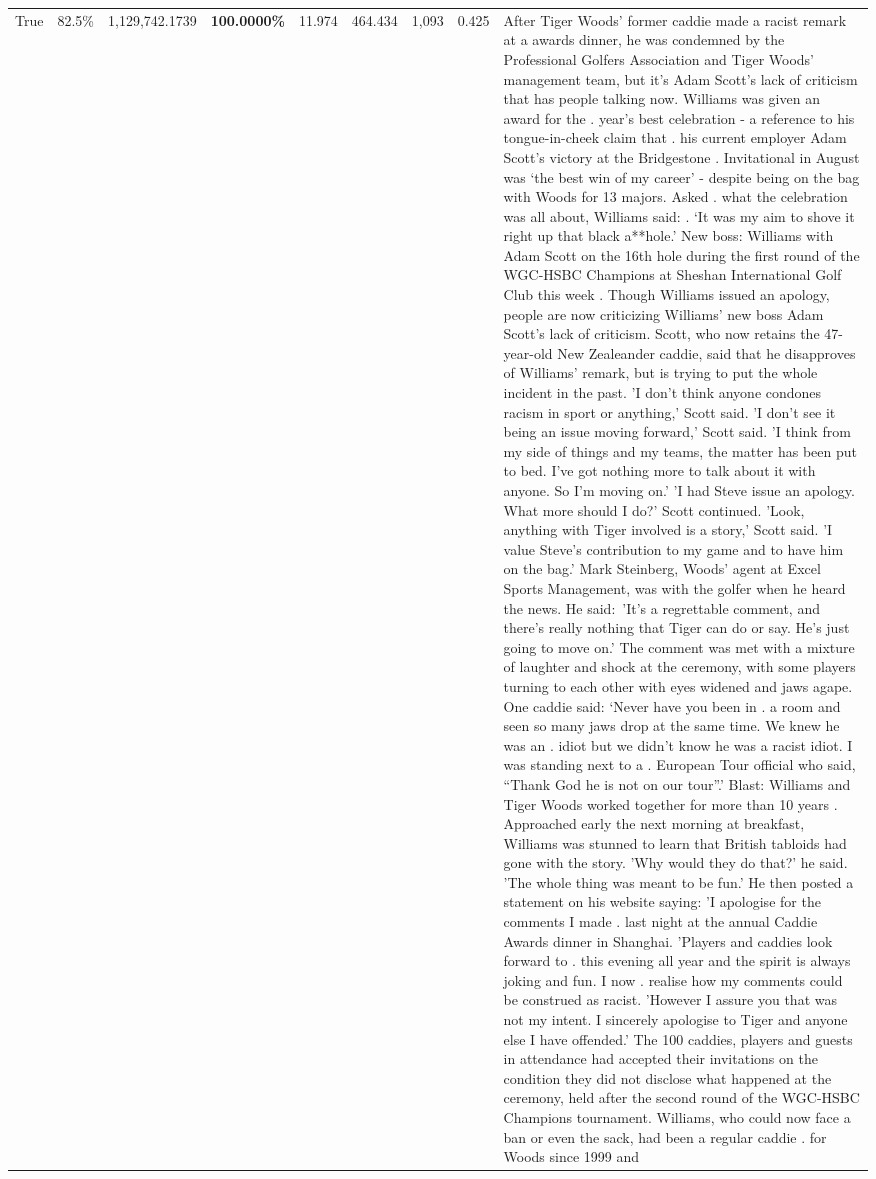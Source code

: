 \begin{table}[H]
\begin{tabular}{lllrlllll}
True & 82.5\% & 1,129,742.1739 & \bfseries \color{red} 100.0000\% & 11.974 & 464.434 & 1,093 & 0.425 & After Tiger Woods' former caddie made a racist remark at a awards dinner, he was condemned by the Professional Golfers Association and Tiger Woods' management team, but it's Adam Scott's lack of criticism that has people talking now. Williams was given an award for the . year’s best celebration - a reference to his tongue-in-cheek claim that . his current employer Adam Scott’s victory at the Bridgestone . Invitational in August was ‘the best win of my career’ - despite being on the bag with Woods for 13 majors. Asked . what the celebration was all about, Williams said: . ‘It was my aim to shove it right up that black a**hole.’ New boss: Williams with Adam Scott  on the 16th hole during the first round of the WGC-HSBC Champions at Sheshan International Golf Club this week . Though Williams issued an apology, people are now criticizing Williams' new boss Adam Scott's lack of criticism. Scott, who now retains the 47-year-old New Zealeander caddie, said that he disapproves of Williams' remark, but is trying to put the whole incident in the past. 'I don't think anyone condones racism in sport or anything,' Scott said. 'I don't see it being an issue moving forward,' Scott said. 'I think from my side of things and my teams, the matter has been put to bed. I've got nothing more to talk about it with anyone. So I'm moving on.' 'I had Steve issue an apology. What more should I do?' Scott continued. 'Look, anything with Tiger involved is a story,' Scott said. 'I value Steve's contribution to my game and to have him on the bag.' Mark Steinberg, Woods' agent at Excel Sports Management, was with the golfer when he heard the news. He said: 'It's a regrettable comment, and there's really nothing that Tiger can do or say. He's just going to move on.' The comment was met with a mixture of laughter and shock at the ceremony, with some players turning to each other with eyes widened and jaws agape. One caddie said: ‘Never have you been in . a room and seen so many jaws drop at the same time. We knew he was an . idiot but we didn’t know he was a racist idiot. I was standing next to a . European Tour official who said, “Thank God he is not on our tour”.’ Blast: Williams and Tiger Woods worked together for more than 10 years . Approached early the next morning at breakfast, Williams was stunned to learn that British tabloids had gone with the story. 'Why would they do that?' he said. 'The whole thing was meant to be fun.' He then posted a statement on his website saying: 'I apologise for the comments I made . last night at the annual Caddie Awards dinner in Shanghai. 'Players and caddies look forward to . this evening all year and the spirit is always joking and fun. I now . realise how my comments could be construed as racist. 'However I assure you that was not my intent. I sincerely apologise to Tiger and anyone else I have offended.' The 100 caddies, players and guests in attendance had accepted their invitations on the condition they did not disclose what happened at the ceremony, held after the second round of the WGC-HSBC Champions tournament. Williams, who could now face a ban or even the sack, had been a regular caddie . for Woods since 1999 and 
\end{tabular}
\end{table}
